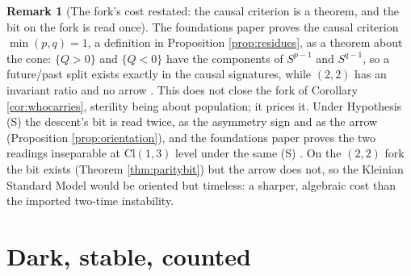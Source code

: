 \documentclass[11pt]{article}
\theoremstyle{definition}
\newtheorem{remark}[theorem]{Remark}
\newcommand{\Cl}{\mathrm{Cl}}
\let\oldsection\section
\renewcommand{\section}{\clearpage\oldsection}   %
\begin{document}
\begin{remark}[The fork's cost restated: the causal criterion is a theorem, and the bit on the fork is read once]\label{rem:forkrepriced}
The foundations paper proves the causal criterion $\min(p, q) = 1$, a definition in Proposition \ref{prop:residues}, as a theorem about the cone: $\{Q > 0\}$ and $\{Q < 0\}$ have the components of $S^{p-1}$ and $S^{q-1}$, so a future/past split exists exactly in the causal signatures, while $(2,2)$ has an invariant ratio and no arrow \cite[Lem.~4.4(iv)]{ButlerT16}. This does not close the fork of Corollary \ref{cor:whocarries}, sterility being about population; it prices it. Under Hypothesis (S) the descent's bit is read twice, as the asymmetry sign and as the arrow (Proposition \ref{prop:orientation}), and the foundations paper proves the two readings inseparable at $\Cl(1,3)$ level under the same (S) \cite[Cor.~5.7]{ButlerT16}. On the $(2,2)$ fork the bit exists (Theorem \ref{thm:paritybit}) but the arrow does not, so the Kleinian Standard Model would be oriented but timeless: a sharper, algebraic cost than the imported two-time instability.
\end{remark}

\section{Dark, stable, counted}\label{sec:count}
\end{document}
